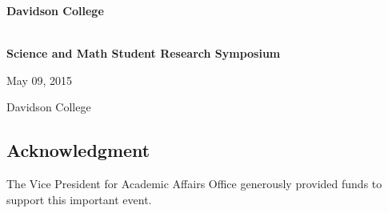 \documentclass{article}
\begin{document}
\raggedright{}

\begin{center}
{\huge\bfseries Davidson College}


{\huge\bfseries \the\year  \\ Science and Math Student Research Symposium}

May 09, 2015

Davidson College
\end{center}

\tableofcontents

\subsection*{Acknowledgment}
The Vice President for Academic Affairs Office generously provided
funds to support this important event.

\thispagestyle{empty}
\clearpage
\setcounter{page}{1}
\end{document}
